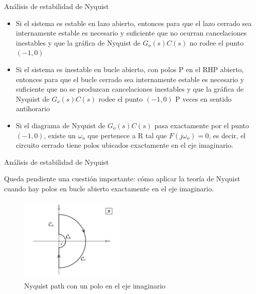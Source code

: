 \documentclass{beamer}
\begin{document}
\begin{frame}{Análisis de estabilidad de Nyquist}
\begin{justify}

\begin{itemize}
\justifying
    \item Si el sistema es estable en lazo abierto, entonces para que el lazo cerrado sea internamente estable es necesario y suficiente que no ocurran cancelaciones inestables y que la gráfica de Nyquist de $G_o(s)C(s)$ no rodee el punto $(-1, 0)$
    \vspace{0.3cm}
    \item Si el sistema es inestable en bucle abierto, con polos P en el RHP abierto, entonces para que el bucle cerrado sea internamente estable es necesario y suficiente que no se produzcan cancelaciones inestables y que la gráfica de Nyquist de $G_o(s)C(s)$ rodee el punto $(-1, 0)$ P veces en sentido antihorario
    \vspace{0.3cm}
    \item Si el diagrama de Nyquist de $G_o(s)C(s)$ pasa exactamente por el punto $(-1, 0)$, existe un $\omega_o$ que pertenece a R tal que $F(j\omega_o) = 0$, es decir, el circuito cerrado tiene polos ubicados exactamente en el eje imaginario.
    
\end{itemize}

\end{justify}
\end{frame}

\begin{frame}{Análisis de estabilidad de Nyquist}
\begin{justify}

\begin{itemize}

   Queda pendiente una cuestión importante: cómo aplicar la teoría de Nyquist cuando hay polos en bucle abierto exactamente en el eje imaginario.
    \begin{figure}[H]
    \centering
    \includegraphics[width=2in]{imagenes/nyquist-modificado.png}
    \caption{Nyquist path con un polo en el eje imaginario}
    \label{niquist-function}
    \end{figure}
    
\end{itemize}

\end{justify}
\end{frame}
\end{document}
